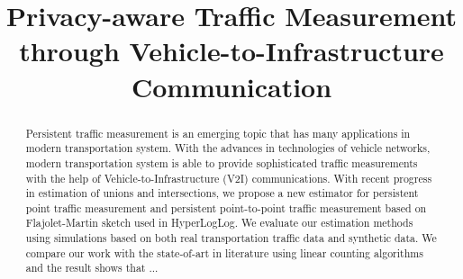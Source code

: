 \documentclass[conference]{IEEEtran}
\begin{document}
 

 
 
\title{Privacy-aware Traffic Measurement through Vehicle-to-Infrastructure Communication}


\maketitle
\vspace{-1in}
\begin{abstract}
	Persistent traffic measurement is an emerging topic that has many applications in modern transportation system. With the advances in technologies of vehicle networks, modern transportation system is able to provide sophisticated traffic measurements with the help of Vehicle-to-Infrastructure (V2I) communications. With recent progress in estimation of unions and intersections, we propose a new estimator for persistent point traffic measurement and persistent point-to-point traffic measurement based on Flajolet-Martin sketch used in HyperLogLog. We evaluate our estimation methods using simulations based on both real transportation traffic data and synthetic data. We compare our work with the state-of-art in literature using linear counting algorithms and the result shows that ...
\end{abstract}

 


 
 


 


 

 

 

 

 



 
\end{document}
